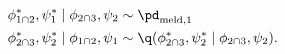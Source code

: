 \begin{align}
  \phi_{1 \cap 2}^{*}, \psi_{1}^{*} \mid \phi_{2 \cap 3}, \psi_{2} &\sim \pd_{\text{meld}, 1} \\
  \phi_{2 \cap 3}^{*}, \psi_{2}^{*} \mid \phi_{1 \cap 2}, \psi_{1} &\sim \q(\phi_{2 \cap 3}^{*}, \psi_{2}^{*} \mid \phi_{2 \cap 3}, \psi_{2}).
  \label{eqn:stage-two-gibbs-updates}
\end{align}